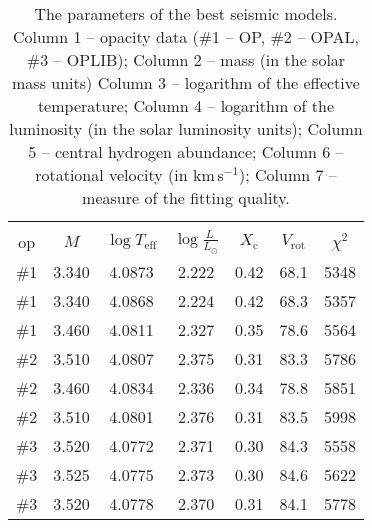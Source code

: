 \documentclass[epj,twocolumn]{webofc}
\begin{document}
\begin{table}
\centering
\caption{The parameters of the best seismic models. Column 1 -- opacity data
        (\#1 -- OP, \#2 -- OPAL, \#3 -- OPLIB);
        Column 2 -- mass (in the solar mass units)        
        Column 3 -- logarithm of the effective temperature;
        Column 4 -- logarithm of the luminosity (in the solar luminosity units);
        Column 5 -- central hydrogen abundance; Column 6 -- rotational velocity (in km\,s$^{-1}$);
        Column 7 -- measure of the fitting quality.}
\label{tab-1}       %
\begin{tabular}{ccccccc}
\hline
\vspace{-10pt}
   &     &                       &                              &                &                  &           \\
\vspace{1pt}
op & $M$ & $\log T_\mathrm{eff}$ & $\log \frac{L^{~}}{L_\odot}$ & $X_\mathrm{c}$ & $V_\mathrm{rot}$ & $\chi^2$  \\
\hline
\#1   &3.340& 4.0873                & 2.222           & 0.42          & 68.1             & 5348\\
\#1   &3.340& 4.0868                & 2.224           & 0.42          & 68.3             & 5357\\
\#1   &3.460& 4.0811                & 2.327           & 0.35          & 78.6             & 5564\\

\#2   &3.510& 4.0807                & 2.375           & 0.31          & 83.3             & 5786\\
\#2   &3.460& 4.0834                & 2.336           & 0.34          & 78.8             & 5851\\
\#2   &3.510& 4.0801                & 2.376           & 0.31          & 83.5             & 5998\\

\#3   &3.520& 4.0772                & 2.371           & 0.30          & 84.3             & 5558\\
\#3   &3.525& 4.0775                & 2.373           & 0.30          & 84.6             & 5622\\
\#3   &3.520& 4.0778                & 2.370           & 0.31          & 84.1             & 5778\\
\hline
\end{tabular}
\end{table}
\end{document}
